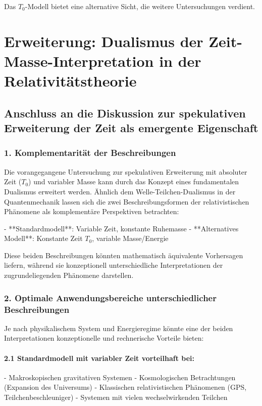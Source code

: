 \documentclass{article}
\begin{document}
	Das \( T_0 \)-Modell bietet eine alternative Sicht, die weitere Untersuchungen verdient.
	
	\section{Erweiterung: Dualismus der Zeit-Masse-Interpretation in der Relativitätstheorie}
	
	\subsection{Anschluss an die Diskussion zur spekulativen Erweiterung der Zeit als emergente Eigenschaft}
	
	\subsubsection{1. Komplementarität der Beschreibungen}
	
	Die vorangegangene Untersuchung zur spekulativen Erweiterung mit absoluter Zeit (\( T_0 \)) und variabler Masse kann durch das Konzept eines fundamentalen Dualismus erweitert werden. Ähnlich dem Welle-Teilchen-Dualismus in der Quantenmechanik lassen sich die zwei Beschreibungsformen der relativistischen Phänomene als komplementäre Perspektiven betrachten:
	
	- **Standardmodell**: Variable Zeit, konstante Ruhemasse
	- **Alternatives Modell**: Konstante Zeit \( T_0 \), variable Masse/Energie
	
	Diese beiden Beschreibungen könnten mathematisch äquivalente Vorhersagen liefern, während sie konzeptionell unterschiedliche Interpretationen der zugrundeliegenden Phänomene darstellen.
	
	\subsubsection{2. Optimale Anwendungsbereiche unterschiedlicher Beschreibungen}
	
	Je nach physikalischem System und Energieregime könnte eine der beiden Interpretationen konzeptionelle und rechnerische Vorteile bieten:
	
	\paragraph{2.1 Standardmodell mit variabler Zeit vorteilhaft bei:}
	- Makroskopischen gravitativen Systemen
	- Kosmologischen Betrachtungen (Expansion des Universums)
	- Klassischen relativistischen Phänomenen (GPS, Teilchenbeschleuniger)
	- Systemen mit vielen wechselwirkenden Teilchen
	
\end{document}
